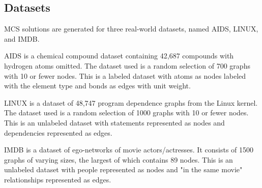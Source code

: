 \subsection{Datasets}
MCS solutions are generated for three real-world datasets, named AIDS, LINUX, and IMDB.

AIDS is a chemical compound dataset containing 42,687 compounds with hydrogen atoms omitted. The dataset used is a random selection of 700 graphs with 10 or fewer nodes. This is a labeled dataset with atoms as nodes labeled with the element type and bonds as edges with unit weight.

LINUX \cite{wang2012efficient} is a dataset of 48,747 program dependence graphs from the Linux kernel. The dataset used is a random selection of 1000 graphs with 10 or fewer nodes. This is an unlabeled dataset with statements represented as nodes and dependencies represented as edges.

IMDB \cite{yanardag2015deep} is a dataset of ego-networks of movie actors/actresses. It consists of 1500 graphs of varying sizes, the largest of which contains 89 nodes. This is an unlabeled dataset with people represented as nodes and "in the same movie" relationships represented as edges.